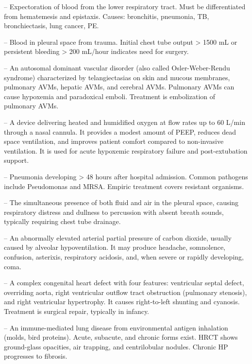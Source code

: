 -- Expectoration of blood from the lower respiratory tract. Must be differentiated from hematemesis and epistaxis. Causes: bronchitis, pneumonia, TB, bronchiectasis, lung cancer, PE.

-- Blood in pleural space from trauma. Initial chest tube output > 1500 mL or persistent bleeding > 200 mL/hour indicates need for surgery.

-- An autosomal dominant vascular disorder (also called Osler-Weber-Rendu syndrome) characterized by telangiectasias on skin and mucous membranes, pulmonary AVMs, hepatic AVMs, and cerebral AVMs. Pulmonary AVMs can cause hypoxemia and paradoxical emboli. Treatment is embolization of pulmonary AVMs.

-- A device delivering heated and humidified oxygen at flow rates up to 60 L/min through a nasal cannula. It provides a modest amount of PEEP, reduces dead space ventilation, and improves patient comfort compared to non-invasive ventilation. It is used for acute hypoxemic respiratory failure and post-extubation support.

-- Pneumonia developing > 48 hours after hospital admission. Common pathogens include Pseudomonas and MRSA. Empiric treatment covers resistant organisms.

-- The simultaneous presence of both fluid and air in the pleural space, causing respiratory distress and dullness to percussion with absent breath sounds, typically requiring chest tube drainage.

-- An abnormally elevated arterial partial pressure of carbon dioxide, usually caused by alveolar hypoventilation. It may produce headache, somnolence, confusion, asterixis, respiratory acidosis, and, when severe or rapidly developing, coma.

-- A complex congenital heart defect with four features: ventricular septal defect, overriding aorta, right ventricular outflow tract obstruction (pulmonary stenosis), and right ventricular hypertrophy. It causes right-to-left shunting and cyanosis. Treatment is surgical repair, typically in infancy.

-- An immune-mediated lung disease from environmental antigen inhalation (molds, bird proteins). Acute, subacute, and chronic forms exist. HRCT shows ground-glass opacities, air trapping, and centrilobular nodules. Chronic HP progresses to fibrosis.

